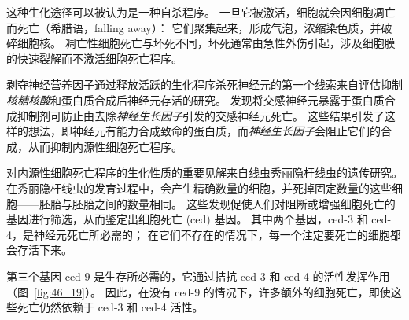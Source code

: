 这种生化途径可以被认为是一种自杀程序。
一旦它被激活，细胞就会因细胞凋亡而死亡（希腊语，falling away）：
它们聚集起来，形成气泡，浓缩染色质，并破碎细胞核。
凋亡性细胞死亡与坏死不同，坏死通常由急性外伤引起，涉及细胞膜的快速裂解而不激活细胞死亡程序。


剥夺神经营养因子通过释放活跃的生化程序杀死神经元的第一个线索来自评估抑制\textit{核糖核酸}和蛋白质合成后神经元存活的研究。
发现将交感神经元暴露于蛋白质合成抑制剂可防止由去除\textit{神经生长因子}引发的交感神经元死亡。
这些结果引发了这样的想法，即神经元有能力合成致命的蛋白质，而\textit{神经生长因子}会阻止它们的合成，从而抑制内源性细胞死亡程序。


对内源性细胞死亡程序的生化性质的重要见解来自线虫秀丽隐杆线虫的遗传研究。
在秀丽隐杆线虫的发育过程中，会产生精确数量的细胞，并死掉固定数量的这些细胞——胚胎与胚胎之间的数量相同。
这些发现促使人们对阻断或增强细胞死亡的基因进行筛选，从而鉴定出细胞死亡 (ced) 基因。
其中两个基因，ced-3 和 ced-4，是神经元死亡所必需的；
在它们不存在的情况下，每一个注定要死亡的细胞都会存活下来。

第三个基因 ced-9 是生存所必需的，它通过拮抗 ced-3 和 ced-4 的活性发挥作用（图~\ref{fig:46_19}）。
因此，在没有 ced-9 的情况下，许多额外的细胞死亡，即使这些死亡仍然依赖于 ced-3 和 ced-4 活性。


